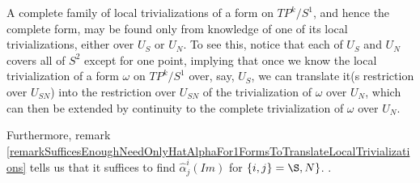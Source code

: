 \begin{example}[$P^k$]
A complete family of local trivializations of a form on $TP^k/S^1$, and hence the complete form, may be found only from knowledge of one of its local trivializations, either over $U_S$ or $U_N$. To see this, notice that each of $U_S$ and $U_N$ covers all of $S^2$ except for one point, implying that once we know the local trivialization of a form $\omega$ on $TP^k/S^1$ over, say, $U_S$, we can translate it(s restriction over $U_{SN}$) into the restriction over $U_{SN}$ of the trivialization of $\omega$ over $U_N$, which can then be extended by continuity to the complete trivialization of $\omega$ over $U_N$. 

Furthermore, remark \ref{remarkSufficesEnoughNeedOnlyHatAlphaFor1FormsToTranslateLocalTrivializations} tells us that it suffices to find $\hat \alpha^i_j(Im)$ for $\{i, j\} = \S, N\}$. .
\end{example}






    
        
    
        

